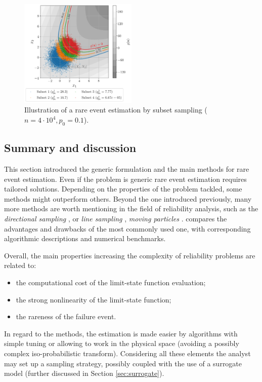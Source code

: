 \begin{figure}
    \centering
    \includegraphics[width=0.5\textwidth]{../numerical_experiments/chapter1/figures/reliability_SS_illustration.png}
    \caption{Illustration of a rare event estimation by subset sampling ($n=4\cdot10^4, p_0 = 0.1$).}
    \label{fig:SS_reliability}
\end{figure}


\subsection{Summary and discussion}

This section introduced the generic formulation and the main methods for rare event estimation. 
Even if the problem is generic rare event estimation requires tailored solutions. 
Depending on the properties of the problem tackled, some methods might outperform others. 
Beyond the one introduced previously, many more methods are worth mentioning in the field of reliability analysis, such as the \textit{directional sampling} \citet{bjerager_1988_directional_sampling}, or \textit{line sampling} \citep{koutsourelakis_2004_line_sampling}, \textit{moving particles} \citep{walter_2015_moving_particles}. 
\citet{MorioBalesdent2015} compares the advantages and drawbacks of the most commonly used one, with corresponding algorithmic descriptions and numerical benchmarks. 

Overall, the main properties increasing the complexity of reliability problems are related to:
\begin{itemize}
    \item the computational cost of the limit-state function evaluation;
    \item the strong nonlinearity of the limit-state function;
    \item the rareness of the failure event.
\end{itemize} 
In regard to the methods, the estimation is made easier by algorithms with simple tuning or allowing to work in the physical space (avoiding a possibly complex iso-probabilistic transform).
Considering all these elements the analyst may set up a sampling strategy, possibly coupled with the use of a surrogate model (further discussed in Section \ref{sec:surrogate}). 

